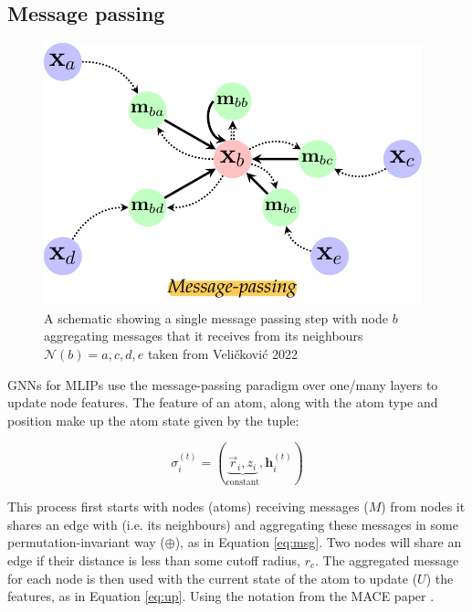 \subsection{Message passing}


\begin{figure}[H]
    \centering
    \includegraphics{figures/message-passing.pdf}
    \caption{A schematic showing a single message passing step with node $b$ aggregating messages that it receives from its neighbours $\mathcal N(b) = {a,c,d,e}$ taken from Veli\v{c}kovi\'{c} 2022 \cite{velivckovic2022message}}
    \label{fig:message-passing}
\end{figure}

GNNs for MLIPs use the message-passing paradigm over one/many layers to update node features. The feature of an atom, along with the atom type and position make up the atom state given by the tuple:

\begin{equation}
    \sigma_i^{(t)} = (\underbrace{\vec r_i, z_i}_\text{constant}, \mathbf h^{(t)}_i)
\end{equation}

This process first starts with nodes (atoms) receiving messages ($M$) from nodes it shares an edge with (i.e. its neighbours) and aggregating these messages in some permutation-invariant way ($\oplus$), as in Equation \ref{eq:msg}. Two nodes will share an edge if their distance is less than some cutoff radius, $r_c$. The aggregated message for each node is then used with the current state of the atom to update ($U$) the features, as in Equation \ref{eq:up}. Using the notation from the MACE paper \cite{batatia2022mace}. 


